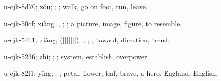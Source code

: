 \begin{multicols}{2}
{\cjkgGlue{}u-cjk-8d70; zǒu; \cjkgGlue{}\cjkgGlue{}\cjkgGlue{}; \cjkgGlue{}; walk, go on foot, run, leave.

\cjkgGlue{}u-cjk-50cf; xiàng; \cjkgGlue{}, \cjkgGlue{}; \cjkgGlue{}; a picture, image, figure, to resemble.

\cjkgGlue{}u-cjk-5411; xiàng; \cjkgGlue{}\cjkgGlue{}(\cjkgGlue{}|\cjkgGlue{}|\cjkgGlue{}|\cjkgGlue{}|\cjkgGlue{}|\cjkgGlue{}|\cjkgGlue{}|\cjkgGlue{}), \cjkgGlue{}, \cjkgGlue{}\cjkgGlue{}\cjkgGlue{}; \cjkgGlue{}; toward, direction, trend.

\cjkgGlue{}u-cjk-5236; zhì; \cjkgGlue{}; \cjkgGlue{}; system, establish, overpower.

\cjkgGlue{}u-cjk-82f1; yīng; \cjkgGlue{}; \cjkgGlue{}; petal, flower, leaf, brave, a hero, England, English.

}
\end{multicols}
